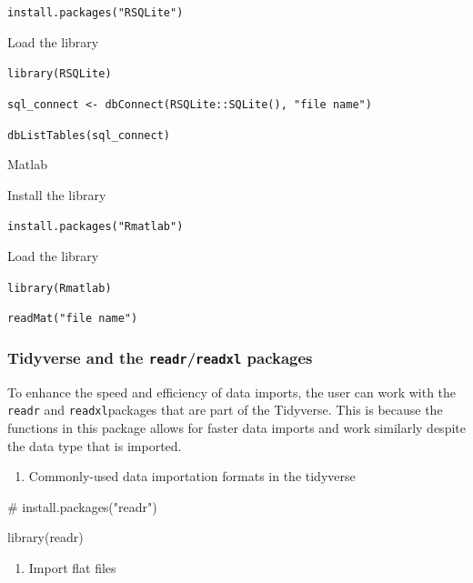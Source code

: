 \documentclass[
  letterpaper,
  DIV=11,
  numbers=noendperiod]{scrreprt}
\newenvironment{Shaded}{}{}
\newcommand{\CommentTok}[1]{\textcolor[rgb]{0.42,0.45,0.49}{#1}}
\newcommand{\FunctionTok}[1]{\textcolor[rgb]{0.44,0.26,0.76}{#1}}
\newcommand{\NormalTok}[1]{\textcolor[rgb]{0.14,0.16,0.18}{#1}}
\providecommand{\tightlist}{%
  \setlength{\itemsep}{0pt}\setlength{\parskip}{0pt}}\usepackage{longtable,booktabs,array}
\begin{document}
\texttt{install.packages("RSQLite")}

Load the library

\texttt{library(RSQLite)}

\texttt{sql\_connect\ \textless{}-\ dbConnect(RSQLite::SQLite(),\ "file\ name")}

\texttt{dbListTables(sql\_connect)}

Matlab

Install the library

\texttt{install.packages("Rmatlab")}

Load the library

\texttt{library(Rmatlab)}

\texttt{readMat("file\ name")}

\subsubsection{\texorpdfstring{Tidyverse and the
\texttt{readr}/\texttt{readxl}
packages}{Tidyverse and the readr/readxl packages}}\label{tidyverse-and-the-readrreadxl-packages}

To enhance the speed and efficiency of data imports, the user can work
with the \texttt{readr} and \texttt{readxl}packages that are part of the
Tidyverse. This is because the functions in this package allows for
faster data imports and work similarly despite the data type that is
imported.

\begin{enumerate}
\def\labelenumi{\arabic{enumi}.}
\tightlist
\item
  Commonly-used data importation formats in the tidyverse
\end{enumerate}

\begin{Shaded}
\begin{Highlighting}[]
\CommentTok{\# install.packages("readr")}
\end{Highlighting}
\end{Shaded}

\begin{Shaded}
\begin{Highlighting}[]
\FunctionTok{library}\NormalTok{(readr)}
\end{Highlighting}
\end{Shaded}

\begin{enumerate}
\def\labelenumi{\alph{enumi}.}
\tightlist
\item
  Import flat files
\end{enumerate}
\end{document}
